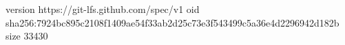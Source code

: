 version https://git-lfs.github.com/spec/v1
oid sha256:7924bc895c2108f1409ae54f33ab2d25c73e3f543499c5a36e4d2296942d182b
size 33430
